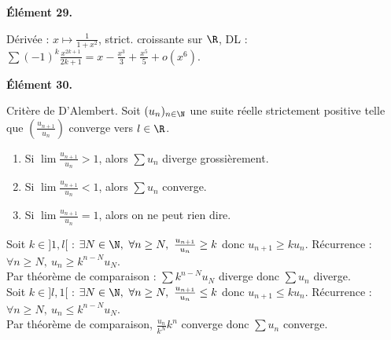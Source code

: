 \documentclass[11pt]{article}
\begin{document}
\begin{center}
    \bf{Élément 29.}
\end{center}

\begin{rappel}{}{}
    Dérivée : $x\mapsto\frac{1}{1+x^2}$, strict. croissante sur $\R$, DL : $\sum(-1)^{k}\frac{x^{2k+1}}{2k+1} = x - \frac{x^3}{3} + \frac{x^5}{5} + o(x^6)$.
\end{rappel}


\begin{center}
    \bf{Élément 30.}
\end{center}

\begin{prop}{Critère de D'Alembert.  }{}
    Soit $(u_n)_{n\in\N}$ une suite réelle strictement positive telle que $\left(\frac{u_{n+1}}{u_n}\right)$ converge vers $l\in\R$.
    \begin{enumerate}
        \item Si $\lim\frac{u_{n+1}}{u_n}>1$, alors $\sum u_n$ diverge grossièrement.
        \item Si $\lim\frac{u_{n+1}}{u_n}<1$, alors $\sum u_n$ converge.
        \item Si $\lim\frac{u_{n+1}}{u_n}=1$, alors on ne peut rien dire.
    \end{enumerate}
    \tcblower
     Soit $k\in]1,l[$ : $\exists N \in \N, ~ \forall n \geq N, ~ \frac{u_{n+1}}{u_n} \geq k$ donc $u_{n+1}\geq ku_n$. Récurrence : $\forall n \geq N, ~ u_n \geq k^{n-N}u_N$.\\
    Par théorème de comparaison : $\sum k^{n-N}u_N$ diverge donc $\sum u_n$ diverge.\\
     Soit $k\in]l,1[$ : $\exists N \in \N, ~ \forall n \geq N, ~ \frac{u_{n+1}}{u_n}\leq k$ donc $u_{n+1}\leq ku_n$. Récurrence : $\forall n \geq N, ~ u_n \leq k^{n-N}u_N$.\\
    Par théorème de comparaison, $\frac{u_n}{k^N}k^n$ converge donc $\sum u_n$ converge.
\end{prop}
\end{document}
